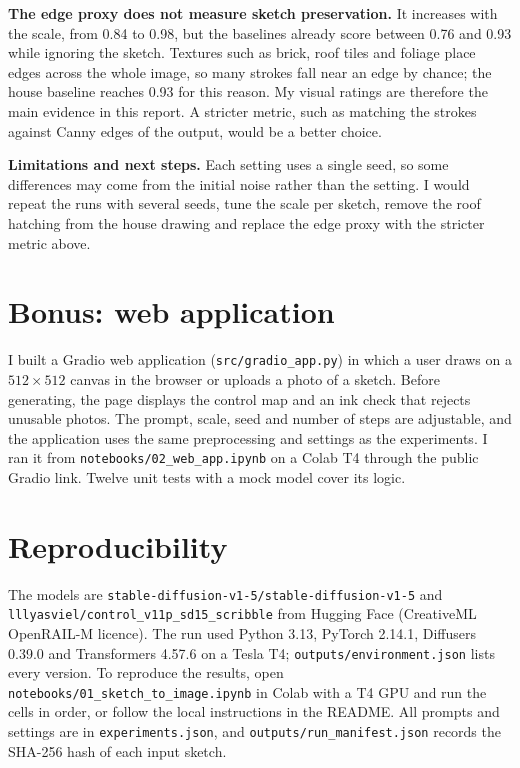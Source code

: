 \documentclass[10pt,a4paper]{article}
\begin{document}
\textbf{The edge proxy does not measure sketch preservation.} It increases with the scale, from 0.84 to 0.98, but the baselines already score between 0.76 and 0.93 while ignoring the sketch. Textures such as brick, roof tiles and foliage place edges across the whole image, so many strokes fall near an edge by chance; the house baseline reaches 0.93 for this reason. My visual ratings are therefore the main evidence in this report. A stricter metric, such as matching the strokes against Canny edges of the output, would be a better choice.

\textbf{Limitations and next steps.} Each setting uses a single seed, so some differences may come from the initial noise rather than the setting. I would repeat the runs with several seeds, tune the scale per sketch, remove the roof hatching from the house drawing and replace the edge proxy with the stricter metric above.

\section{Bonus: web application}

I built a Gradio web application (\texttt{src/gradio\_app.py}) in which a user draws on a $512\times512$ canvas in the browser or uploads a photo of a sketch. Before generating, the page displays the control map and an ink check that rejects unusable photos. The prompt, scale, seed and number of steps are adjustable, and the application uses the same preprocessing and settings as the experiments. I ran it from \texttt{notebooks/02\_web\_app.ipynb} on a Colab T4 through the public Gradio link. Twelve unit tests with a mock model cover its logic.

\section{Reproducibility}

The models are \texttt{stable-diffusion-v1-5/stable-diffusion-v1-5} and \texttt{lllyasviel/control\_v11p\_sd15\_scribble} from Hugging Face (CreativeML OpenRAIL-M licence). The run used Python 3.13, PyTorch 2.14.1, Diffusers 0.39.0 and Transformers 4.57.6 on a Tesla T4; \texttt{outputs/environment.json} lists every version. To reproduce the results, open \texttt{notebooks/01\_sketch\_to\_image.ipynb} in Colab with a T4 GPU and run the cells in order, or follow the local instructions in the README. All prompts and settings are in \texttt{experiments.json}, and \texttt{outputs/run\_manifest.json} records the SHA-256 hash of each input sketch.
\end{document}
